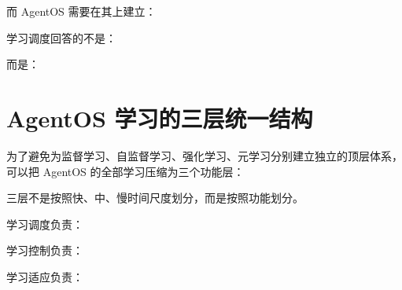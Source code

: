 而 AgentOS 需要在其上建立：

\begin{statementbox}
\centering
{}
\end{statementbox}

学习调度回答的不是：

\begin{statementbox}
\centering
{}
\end{statementbox}

而是：

\begin{statementbox}
\centering
{}
\end{statementbox}


\section{AgentOS 学习的三层统一结构}

为了避免为监督学习、自监督学习、强化学习、元学习分别建立独立的顶层体系，可以把 AgentOS 的全部学习压缩为三个功能层：

\begin{statementbox}
\centering
{}
\end{statementbox}

三层不是按照快、中、慢时间尺度划分，而是按照功能划分。

学习调度负责：

\begin{statementbox}
\centering
{}
\end{statementbox}

学习控制负责：

\begin{statementbox}
\centering
{}
\end{statementbox}

学习适应负责：

\begin{statementbox}
\centering
{}
\end{statementbox}

